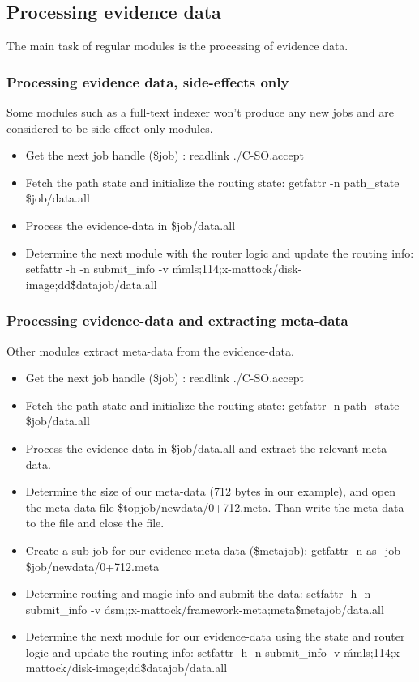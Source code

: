\subsection{Processing evidence data}
The main task of regular modules is the processing of evidence data.
\subsubsection{Processing evidence data, side-effects only}
Some modules such as a full-text indexer won't produce any new jobs and are considered to be side-effect only modules.
\begin{itemize}
\item Get the next job handle (\$job) : readlink \@./C-SO.accept
\item Fetch the path state and initialize the routing state: getfattr -n path\_state \$job/data.all
\item Process the evidence-data in \$job/data.all
\item Determine the next module with the router logic and update the routing info: setfattr -h -n submit\_info -v \'mmls;114;x-mattock/disk-image;dd\' \$datajob/data.all
\end{itemize}
\subsubsection{Processing evidence-data and extracting meta-data}
Other modules extract meta-data from the evidence-data.
\begin{itemize}
\item Get the next job handle (\$job) : readlink \@./C-SO.accept
\item Fetch the path state and initialize the routing state: getfattr -n path\_state \$job/data.all
\item Process the evidence-data in \$job/data.all and extract the relevant meta-data.
\item Determine the size of our meta-data (712 bytes in our example), and open the meta-data file \$topjob/newdata/0+712.meta. Than write the meta-data to the file and close the file.
\item Create a sub-job for our evidence-meta-data (\$metajob): getfattr -n as\_job \$job/newdata/0+712.meta
\item Determine routing and magic info and submit the data: setfattr -h -n submit\_info -v \'dsm;;x-mattock/framework-meta;meta\' \$metajob/data.all
\item Determine the next module for our evidence-data using the state and router logic and update the routing info: setfattr -h -n submit\_info -v \'mmls;114;x-mattock/disk-image;dd\' \$datajob/data.all
\end{itemize}
